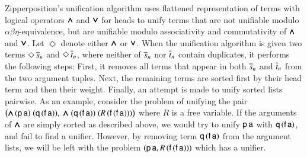 Zipperposition's unification algorithm 
uses flattened representation of terms with logical operators $\pmb{\land}$ and $\pmb{\lor}$
for heads to unify terms that are not unifiable modulo $\alpha\beta\eta$-equivalence, but
are unifiable modulo associativity and commutativity of $\pmb{\land}$ and $\pmb{\lor}$. Let
$\Diamond$ denote either $\pmb{\land}$ or $\pmb{\lor}$. When the unification algorithm is given
two terms $\Diamond \, \overline{s}_{n}$ and $\Diamond \, \overline{t}_{n}$, where neither
of $\overline{s}_{n}$ nor $\overline{t}_{n}$ contain duplicates, it performs the
following steps: First, it removes all terms that appear in both
$\overline{s}_{n}$ and $\overline{t}_{n}$ from the two argument tuples.
Next, the remaining terms are sorted first by their head term and then their weight. Finally,
an attempt is made to unify sorted lists pairwise.
%
As an example, consider the problem of unifying the pair $\big({\pmb{\land}} \,
(\mathsf{p} \, \mathsf{a}) \; (\mathsf{q} \, (\mathsf{f} \, \mathsf{a})), \; {\pmb{\land}} \;
(\mathsf{q} \, (\mathsf{f} \, \mathsf{a})) \; (R \, (\mathsf{f} \, (\mathsf{f} \,
\mathsf{a})))\bigr)$ where $R$ is a free variable. If the arguments of $\pmb{\land}$ are
simply sorted as described above, we would try to unify $\mathsf{p} \, \mathsf{a}$
with $\mathsf{q} \, (\mathsf{f} \, \mathsf{a})$, and fail to find a unifier. However, by
removing term  $\mathsf{q} \, (\mathsf{f} \, \mathsf{a})$ from the argument lists, we
will be left with the problem $(\mathsf{p} \, \mathsf{a},  R \, (\mathsf{f} \, (\mathsf{f}
\, \mathsf{a})))$ which has a unifier.

